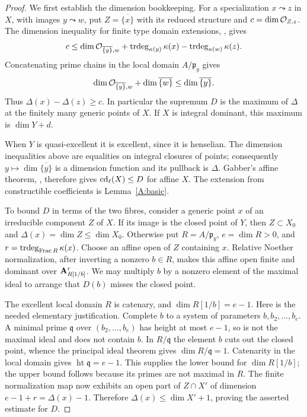 \begin{proof}
We first establish the dimension bookkeeping. For a specialization $x\leadsto z$ in $X$, with images $y\leadsto w$, put $Z=\overline{\{x\}}$ with its reduced structure and $c=\dim\mathcal O_{Z,z}$. The dimension inequality for finite type domain extensions, \citet[Tag 02IJ, Lemma 10.113.1]{A_Stacks}, gives
\[
c\leq\dim\mathcal O_{\overline{\{y\}},w}
 +\operatorname{trdeg}_{\kappa(y)}\kappa(x)
 -\operatorname{trdeg}_{\kappa(w)}\kappa(z).
\]
Concatenating prime chains in the local domain $A/\mathfrak p_y$ gives
\[
\dim\mathcal O_{\overline{\{y\}},w}
+\dim\overline{\{w\}}
\leq\dim\overline{\{y\}}.
\]
Thus $\Delta(x)-\Delta(z)\geq c$. In particular the supremum $D$ is the maximum of $\Delta$ at the finitely many generic points of $X$. If $X$ is integral dominant, this maximum is $\dim Y+d$.

When $Y$ is quasi-excellent it is excellent, since it is henselian. The dimension inequalities above are equalities on integral closures of points; consequently $y\mapsto\dim\overline{\{y\}}$ is a dimension function and its pullback is $\Delta$. Gabber's affine theorem, \citet[Exposé XV, Corollaire 1.2.2]{A_ILO2014}, therefore gives $\operatorname{cd}_\ell(X)\leq D$ for affine $X$. The extension from constructible coefficients is Lemma~\ref{A:basic}.

To bound $D$ in terms of the two fibres, consider a generic point $x$ of an irreducible component $Z$ of $X$. If its image is the closed point of $Y$, then $Z\subset X_0$ and $\Delta(x)=\dim Z\leq\dim X_0$. Otherwise put $R=A/\mathfrak p_y$, $e=\dim R>0$, and $r=\operatorname{trdeg}_{\operatorname{Frac} R}\kappa(x)$. Choose an affine open of $Z$ containing $x$. Relative Noether normalization, after inverting a nonzero $b\in R$, makes this affine open finite and dominant over $\mathbf A^r_{R[1/b]}$. We may multiply $b$ by a nonzero element of the maximal ideal to arrange that $D(b)$ misses the closed point.

The excellent local domain $R$ is catenary, and $\dim R[1/b]=e-1$. Here is the needed elementary justification. Complete $b$ to a system of parameters $b,b_2,\ldots,b_e$. A minimal prime $\mathfrak q$ over $(b_2,\ldots,b_e)$ has height at most $e-1$, so is not the maximal ideal and does not contain $b$. In $R/\mathfrak q$ the element $b$ cuts out the closed point, whence the principal ideal theorem gives $\dim R/\mathfrak q=1$. Catenarity in the local domain gives $\operatorname{ht}\mathfrak q=e-1$. This supplies the lower bound for $\dim R[1/b]$; the upper bound follows because its primes are not maximal in $R$. The finite normalization map now exhibits an open part of $Z\cap X'$ of dimension $e-1+r=\Delta(x)-1$. Therefore $\Delta(x)\leq\dim X'+1$, proving the asserted estimate for $D$.


\end{proof}
